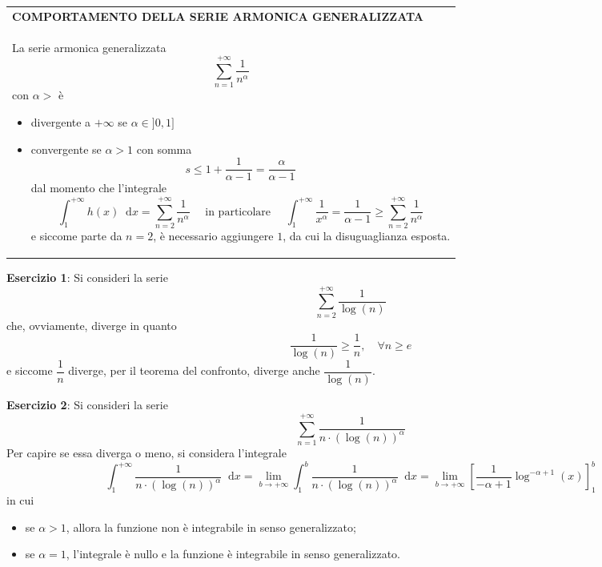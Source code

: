 \documentclass[a4paper]{extarticle}
\renewcommand\arraystretch{}
\newcommand*\dif{\mathop{}\!\mathrm{d}}
\begin{document}
\vspace{1em}
\setlength{\tabcolsep}{14pt}
\renewcommand{\arraystretch}{2}
\noindent
\begin{tabularx}{\textwidth}{@{}|P|@{}}
    \hline
    {\textbf{COMPORTAMENTO DELLA SERIE ARMONICA GENERALIZZATA}}\\
    \parbox{\linewidth}{La serie armonica generalizzata
    \[\sum_{n=1}^{+\infty} \frac{1}{n^\alpha}\]
    con $\alpha>$ è
    \begin{itemize}
        \item divergente a $+\infty$ se $\alpha \in ]0,1]$
        \item convergente se $\alpha>1$ con somma
        \[s \leq 1 + \frac{1}{\alpha - 1} = \frac{\alpha}{\alpha-1}\]
        dal momento che l'integrale
        \[\int_1^{+\infty} h(x) \dif x = \sum_{n=2}^{+\infty} \frac{1}{n^\alpha} \hspace{1em} \text{ in particolare } \hspace{1em} \int_1^{+\infty} \frac{1}{x^\alpha} = \frac{1}{\alpha-1} \geq \sum_{n=2}^{+\infty} \frac{1}{n^\alpha}\]
        e siccome parte da $n=2$, è necessario aggiungere $1$, da cui la disuguaglianza esposta.
    \end{itemize}
    \vspace{1mm}}\\
    \hline
\end{tabularx}

\vspace{2em}
\noindent
\textbf{Esercizio 1}: Si consideri la serie
\[\sum_{n=2}^{+\infty} \frac{1}{\log(n)}\]
che, ovviamente, diverge in quanto
\[\frac{1}{\log(n)} \geq \frac{1}{n}, \hspace{1em} \forall n \geq e\]
e siccome $\dfrac{1}{n}$ diverge, per il teorema del confronto, diverge anche $\dfrac{1}{\log(n)}$.

\vspace{2em}
\noindent
\textbf{Esercizio 2}: Si consideri la serie
\[\sum_{n=1}^{+\infty} \frac{1}{n \cdot (\log(n))^\alpha}\]
Per capire se essa diverga o meno, si considera l'integrale
\[\int_1^{+\infty} \frac{1}{n \cdot (\log(n))^\alpha} \dif x = \lim_{b \to +\infty} \int_1^b \frac{1}{n \cdot (\log(n))^\alpha} \dif x = \lim_{b \to +\infty} \left[\frac{1}{-\alpha+1} \log^{-\alpha+1}(x)\right]_1^b\]
in cui
\begin{itemize}
    \item se $\alpha > 1$, allora la funzione non è integrabile in senso generalizzato;
    \item se $\alpha = 1$, l'integrale è nullo e la funzione è integrabile in senso generalizzato.
\end{itemize}
\end{document}
